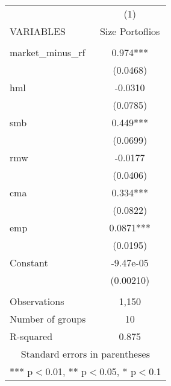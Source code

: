 \begin{tabular}{lc} \hline
 & (1) \\
VARIABLES & Size Portoflios \\ \hline
 &  \\
market\_minus\_rf & 0.974*** \\
 & (0.0468) \\
hml & -0.0310 \\
 & (0.0785) \\
smb & 0.449*** \\
 & (0.0699) \\
rmw & -0.0177 \\
 & (0.0406) \\
cma & 0.334*** \\
 & (0.0822) \\
emp & 0.0871*** \\
 & (0.0195) \\
Constant & -9.47e-05 \\
 & (0.00210) \\
 &  \\
Observations & 1,150 \\
Number of groups & 10 \\
 R-squared & 0.875 \\ \hline
\multicolumn{2}{c}{ Standard errors in parentheses} \\
\multicolumn{2}{c}{ *** p$<$0.01, ** p$<$0.05, * p$<$0.1} \\
\end{tabular}
